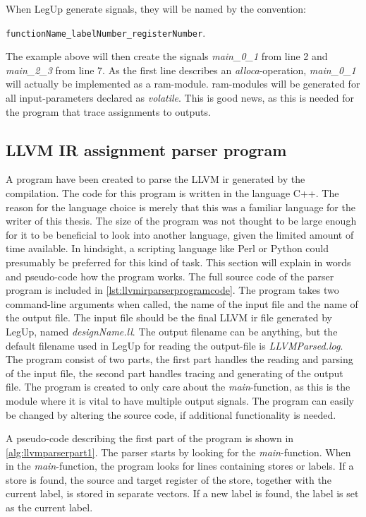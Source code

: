 When LegUp generate signals, they will be named by the convention:

\verb!functionName_labelNumber_registerNumber!. 

The example above will then create the signals \textit{main\_0\_1} from line 2 and \textit{main\_2\_3} from line 7. As the first line describes an \textit{alloca}-operation, \textit{main\_0\_1} will actually be implemented as a \gls{ram}-module. \gls{ram}-modules will be generated for all input-parameters declared as \textit{volatile}. This is good news, as this is needed for the program that trace assignments to outputs.
\subsection{\label{subsec:llvmirparserprogram}LLVM IR assignment parser program}
A program have been created to parse the LLVM \gls{ir} generated by the compilation. The code for this program is written in the language C++. The reason for the language choice is merely that this was a familiar language for the writer of this thesis. The size of the program was not thought to be large enough for it to be beneficial to look into another language, given the limited amount of time available. In hindsight, a scripting language like Perl or Python could presumably be preferred for this kind of task. This section will explain in words and pseudo-code how the program works. The full source code of the parser program is included in \cref{lst:llvmirparserprogramcode}. The program takes two command-line arguments when called, the name of the input file and the name of the output file. The input file should be the final LLVM \gls{ir} file generated by LegUp, named \textit{designName.ll}. The output filename can be anything, but the default filename used in LegUp for reading the output-file is \textit{LLVMParsed.log}. The program consist of two parts, the first part handles the reading and parsing of the input file, the second part handles tracing and generating of the output file. The program is created to only care about the \textit{main}-function, as this is the module where it is vital to have multiple output signals. The program can easily be changed by altering the source code, if additional functionality is needed.

A pseudo-code describing the first part of the program is shown in \cref{alg:llvmparserpart1}. The parser starts by looking for the \textit{main}-function. When in the \textit{main}-function, the program looks for lines containing stores or labels. If a store is found, the source and target register of the store, together with the current label, is stored in separate vectors. If a new label is found, the label is set as the current label.

